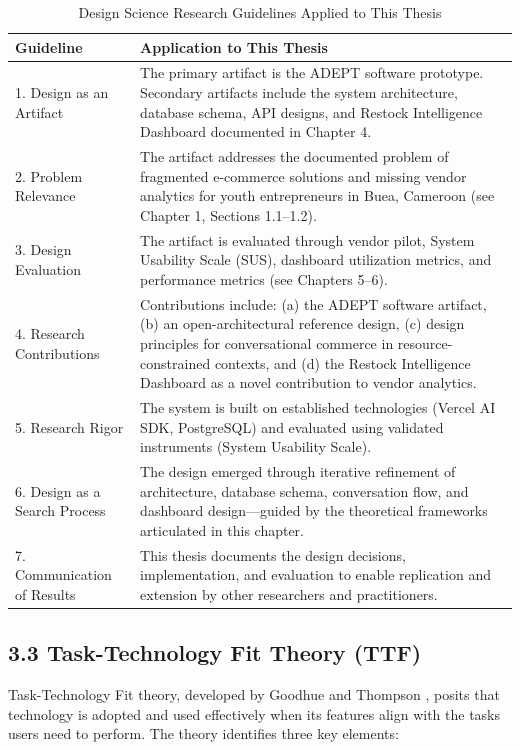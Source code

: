 \documentclass[12pt,a4paper]{article}
\begin{document}
\begin{table}[h]
\centering
\caption{Design Science Research Guidelines Applied to This Thesis}
\label{tab:dsr}
\begin{tabular}{p{4cm}p{10cm}}
\toprule
\textbf{Guideline} & \textbf{Application to This Thesis} \\
\midrule
1. Design as an Artifact & The primary artifact is the ADEPT software prototype. Secondary artifacts include the system architecture, database schema, API designs, and Restock Intelligence Dashboard documented in Chapter 4. \\
2. Problem Relevance & The artifact addresses the documented problem of fragmented e-commerce solutions and missing vendor analytics for youth entrepreneurs in Buea, Cameroon (see Chapter 1, Sections 1.1--1.2). \\
3. Design Evaluation & The artifact is evaluated through vendor pilot, System Usability Scale (SUS), dashboard utilization metrics, and performance metrics (see Chapters 5--6). \\
4. Research Contributions & Contributions include: (a) the ADEPT software artifact, (b) an open-architectural reference design, (c) design principles for conversational commerce in resource-constrained contexts, and (d) the Restock Intelligence Dashboard as a novel contribution to vendor analytics. \\
5. Research Rigor & The system is built on established technologies (Vercel AI SDK, PostgreSQL) and evaluated using validated instruments (System Usability Scale). \\
6. Design as a Search Process & The design emerged through iterative refinement of architecture, database schema, conversation flow, and dashboard design---guided by the theoretical frameworks articulated in this chapter. \\
7. Communication of Results & This thesis documents the design decisions, implementation, and evaluation to enable replication and extension by other researchers and practitioners. \\
\bottomrule
\end{tabular}
\end{table}

\subsection{3.3 Task-Technology Fit Theory (TTF)}

Task-Technology Fit theory, developed by Goodhue and Thompson \citep{goodhue1995}, posits that technology is adopted and used effectively when its features align with the tasks users need to perform. The theory identifies three key elements:
\end{document}
